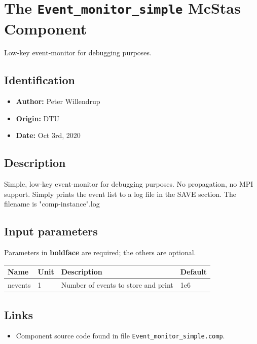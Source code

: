 \section{The \texttt{Event\_monitor\_simple} McStas Component}
Low-key event-monitor for debugging purposes.

\subsection*{Identification}
\begin{itemize}
  \item \textbf{Author:} Peter Willendrup
  \item \textbf{Origin:} DTU
  \item \textbf{Date:} Oct 3rd, 2020
\end{itemize}

\subsection*{Description}
Simple, low-key event-monitor for debugging purposes. No propagation, no MPI support. Simply prints the event list to a log file in the SAVE section. The filename is "comp-instance".log

\subsection*{Input parameters}
Parameters in \textbf{boldface} are required; the others are optional.

\begin{longtable}{p{}p{}p{}p{}}
\toprule
\textbf{Name} & \textbf{Unit} & \textbf{Description} & \textbf{Default} \\
\midrule
\endhead
nevents & 1 & Number of events to store and print & 1e6 \\
\bottomrule
\end{longtable}

\subsection*{Links}
\begin{itemize}
  \item Component source code found in file \texttt{Event\_monitor\_simple.comp}.
\end{itemize}
